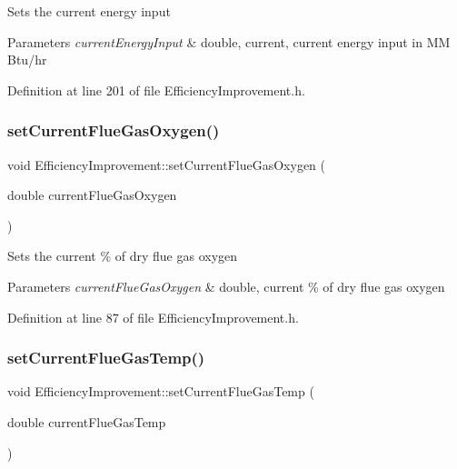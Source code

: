 Sets the current energy input


\begin{DoxyParams}{Parameters}
{\em current\+Energy\+Input} & double, current, current energy input in MM Btu/hr \\
\hline
\end{DoxyParams}


Definition at line 201 of file Efficiency\+Improvement.\+h.

\mbox{\label{class_efficiency_improvement_a038c378d51a5baf96521012a572bb106}} 
\subsubsection{\texorpdfstring{set\+Current\+Flue\+Gas\+Oxygen()}{setCurrentFlueGasOxygen()}}
{\footnotesize\ttfamily void Efficiency\+Improvement\+::set\+Current\+Flue\+Gas\+Oxygen (\begin{DoxyParamCaption}\item[{double}]{current\+Flue\+Gas\+Oxygen }\end{DoxyParamCaption})\hspace{0.3cm}{\ttfamily [inline]}}

Sets the current \% of dry flue gas oxygen


\begin{DoxyParams}{Parameters}
{\em current\+Flue\+Gas\+Oxygen} & double, current \% of dry flue gas oxygen \\
\hline
\end{DoxyParams}


Definition at line 87 of file Efficiency\+Improvement.\+h.

\mbox{\label{class_efficiency_improvement_aef6ffeae5135982ef223ce4a5efe23d8}} 
\subsubsection{\texorpdfstring{set\+Current\+Flue\+Gas\+Temp()}{setCurrentFlueGasTemp()}}
{\footnotesize\ttfamily void Efficiency\+Improvement\+::set\+Current\+Flue\+Gas\+Temp (\begin{DoxyParamCaption}\item[{double}]{current\+Flue\+Gas\+Temp }\end{DoxyParamCaption})\hspace{0.3cm}{\ttfamily [inline]}}


